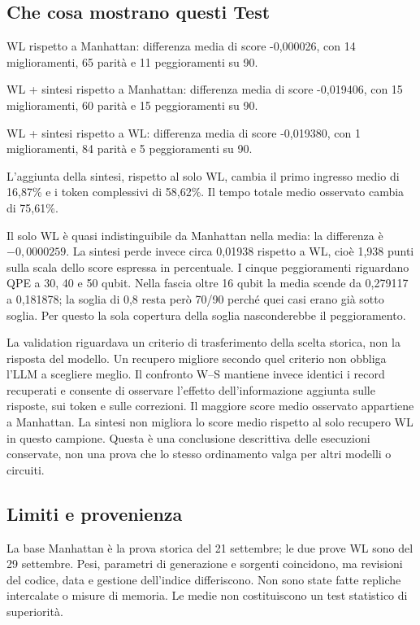 \documentclass[a4paper,10pt]{article}
\begin{document}
\subsection{Che cosa mostrano questi Test}WL rispetto a Manhattan: differenza media di score -0,000026, con 14 miglioramenti, 65 parità e 11 peggioramenti su 90.\par WL + sintesi rispetto a Manhattan: differenza media di score -0,019406, con 15 miglioramenti, 60 parità e 15 peggioramenti su 90.\par WL + sintesi rispetto a WL: differenza media di score -0,019380, con 1 miglioramenti, 84 parità e 5 peggioramenti su 90.\par L'aggiunta della sintesi, rispetto al solo WL, cambia il primo ingresso medio di 16,87\% e i token complessivi di 58,62\%. Il tempo totale medio osservato cambia di 75,61\%.\par Il solo WL è quasi indistinguibile da Manhattan nella media:
la differenza è $-0,0000259$. La sintesi perde invece circa 0,01938
rispetto a WL, cioè 1,938 punti sulla scala dello score espressa in percentuale.
I cinque peggioramenti riguardano QPE a 30, 40 e 50 qubit.
Nella fascia oltre 16 qubit la media scende da 0,279117 a 0,181878;
la soglia di 0,8 resta però 70/90 perché quei casi erano già sotto soglia.
Per questo la sola copertura della soglia nasconderebbe il peggioramento.

La validation riguardava un criterio di trasferimento della scelta storica,
non la risposta del modello. Un recupero migliore secondo quel criterio
non obbliga l'LLM a scegliere meglio. Il confronto W--S mantiene invece identici
i record recuperati e consente di osservare l'effetto dell'informazione aggiunta
sulle risposte, sui token e sulle correzioni.
Il maggiore score medio osservato appartiene a Manhattan. La sintesi non migliora lo score medio rispetto al solo recupero WL in questo campione. Questa è una conclusione descrittiva delle esecuzioni conservate,
non una prova che lo stesso ordinamento valga per altri modelli o circuiti.

\subsection{Limiti e provenienza}
La base Manhattan è la prova storica del 21 settembre; le due prove WL sono
del 29 settembre. Pesi, parametri di generazione e sorgenti coincidono,
ma revisioni del codice, data e gestione dell'indice differiscono.
Non sono state fatte repliche intercalate o misure di memoria.
Le medie non costituiscono un test statistico di superiorità.
\end{document}
